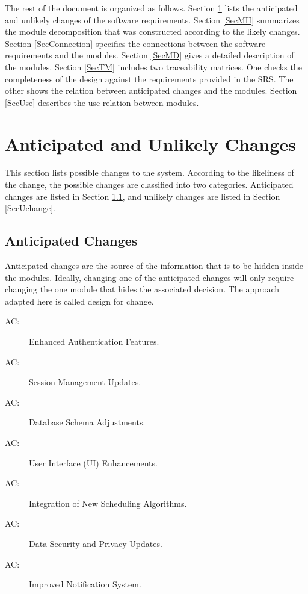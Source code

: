 \documentclass[12pt, titlepage]{article}
\newcounter{acnum}
\newcommand{\actheacnum}{AC\theacnum}
\begin{document}
The rest of the document is organized as follows. Section
\ref{SecChange} lists the anticipated and unlikely changes of the software
requirements. Section \ref{SecMH} summarizes the module decomposition that
was constructed according to the likely changes. Section \ref{SecConnection}
specifies the connections between the software requirements and the
modules. Section \ref{SecMD} gives a detailed description of the
modules. Section \ref{SecTM} includes two traceability matrices. One checks
the completeness of the design against the requirements provided in the SRS. The
other shows the relation between anticipated changes and the modules. Section
\ref{SecUse} describes the use relation between modules.

\section{Anticipated and Unlikely Changes} \label{SecChange}

This section lists possible changes to the system. According to the likeliness
of the change, the possible changes are classified into two
categories. Anticipated changes are listed in Section \ref{SecAchange}, and
unlikely changes are listed in Section \ref{SecUchange}.

\subsection{Anticipated Changes} \label{SecAchange}

Anticipated changes are the source of the information that is to be hidden
inside the modules. Ideally, changing one of the anticipated changes will only
require changing the one module that hides the associated decision. The approach
adapted here is called design for
change.

\begin{description}
\item[ \actheacnum \label{acEnhancedAuth}:] Enhanced Authentication Features.
\item[ \actheacnum \label{acSessionUpdate}:] Session Management Updates.
\item[ \actheacnum \label{acDbSchema}:] Database Schema Adjustments.
\item[ \actheacnum \label{acUIEnhance}:] User Interface (UI) Enhancements.
\item[ \actheacnum \label{acNewAlg}:] Integration of New Scheduling Algorithms.
\item[ \actheacnum \label{acDataSecurity}:] Data Security and Privacy Updates.
\item[ \actheacnum \label{acNotifSystem}:] Improved Notification System. 
\end{description}
\end{document}

